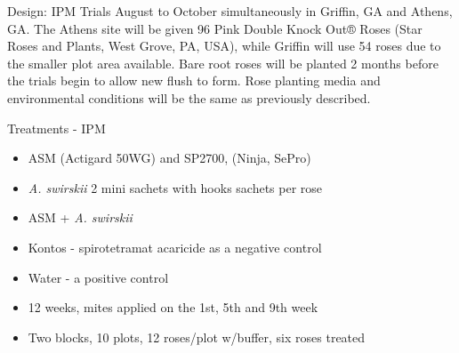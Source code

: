 \documentclass[
  ignorenonframetext,
]{beamer}
\providecommand{\tightlist}{%
  \setlength{\itemsep}{0pt}\setlength{\parskip}{0pt}}
\begin{document}
\begin{frame}
\begin{block}{Design: IPM Trials}
\protect\hypertarget{design-ipm-trials}{}
August to October simultaneously in Griffin, GA and Athens, GA. The
Athens site will be given 96 Pink Double Knock Out® Roses (Star Roses
and Plants, West Grove, PA, USA), while Griffin will use 54 roses due to
the smaller plot area available. Bare root roses will be planted 2
months before the trials begin to allow new flush to form. Rose planting
media and environmental conditions will be the same as previously
described.
\end{block}

\begin{block}{Treatments - IPM}
\protect\hypertarget{treatments---ipm}{}
\begin{itemize}
\tightlist
\item
  ASM (Actigard 50WG) and SP2700, (Ninja, SePro)
\item
  \emph{A. swirskii} 2 mini sachets with hooks sachets per rose
\item
  ASM + \emph{A. swirskii}
\item
  Kontos - spirotetramat acaricide as a negative control
\item
  Water - a positive control
\item
  12 weeks, mites applied on the 1st, 5th and 9th week
\item
  Two blocks, 10 plots, 12 roses/plot w/buffer, six roses treated
\end{itemize}
\end{block}


\end{frame}
\end{document}

